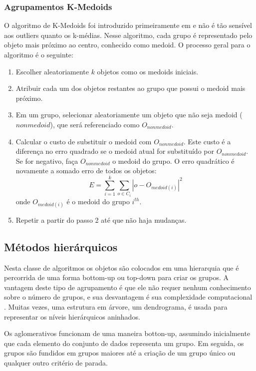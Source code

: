 \subsubsection{Agrupamentos K-Medoids}
O algoritmo de K-Medoids foi introduzido primeiramente em \cite{kaufmann1990} e não é tão sensível aos outliers quanto os k-médias. Nesse algoritmo, cada grupo é representado pelo objeto mais próximo ao centro, conhecido como medoid.
O processo geral para o algoritmo é o seguinte:
 \begin{enumerate}
 	\item Escolher aleatoriamente ${k}$ objetos como os medoids iniciais.
 	\item Atribuir cada um dos objetos restantes ao grupo que possui o medoid mais próximo.
 	\item Em um grupo, selecionar aleatoriamente um objeto que não seja medoid (${nonmedoid}$), que será referenciado como ${O_{nonmedoid}}$.
 	\item Calcular o custo de substituir o medoid com ${O_{nonmedoid}}$. Este custo é a diferença no erro quadrado se o medoid atual for substituído por ${O_{nonmedoid}}$. Se for negativo, faça ${O_{nonmedoid}}$ o medoid do grupo. O erro quadrático é novamente a somado erro de todos os objetos:
 	\begin{equation}
 	E = \sum_{i=1}^{k}\sum_{o\in C_{i}} |o - O_{medoid(i)}|^{2}
 	\end{equation}
 	onde ${O_{medoid(i)}}$ é o medoid do grupo ${i^{th}}$.
 	\item Repetir a partir do passo 2 até que não haja mudanças. 
 \end{enumerate}

\subsection{Métodos hierárquicos}
Nesta classe de algoritmos os objetos são colocados em uma hierarquia que é percorrida de uma forma bottom-up ou top-down para criar os grupos. A vantagem deste tipo de agrupamento é que ele não requer nenhum conhecimento sobre o número de grupos, e sua desvantagem é sua complexidade computacional \cite{Lin2004}. Muitas vezes, uma estrutura em árvore, um dendrograma, é usada para representar os níveis hierárquicos aninhados.

Os aglomerativos funcionam de uma maneira botton-up,
assumindo inicialmente que cada elemento do conjunto de dados representa um grupo. Em seguida, os grupos são fundidos em grupos maiores até a criação de um grupo único ou qualquer outro critério de parada.

